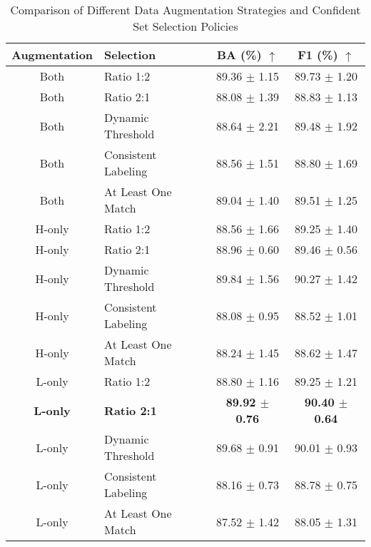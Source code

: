 \documentclass[preprint,12pt,authoryear]{elsarticle}
\begin{document}
\begin{table}[ht]
\centering
\footnotesize
\caption{Comparison of Different Data Augmentation Strategies and Confident Set Selection Policies}
\label{1}
\begin{tabular}{clcc}
\toprule
\textbf{\parbox{2.5cm}{Augmentation}} & \textbf{\parbox{2.5cm}{Selection}} & \textbf{BA (\%)} $\uparrow$ & \textbf{F1 (\%)} $\uparrow$ \\
\midrule
Both & Ratio 1:2 & 89.36 $\pm$ 1.15 & 89.73 $\pm$ 1.20 \\
Both & Ratio 2:1 & 88.08 $\pm$ 1.39 & 88.83 $\pm$ 1.13 \\
Both & Dynamic Threshold & 88.64 $\pm$ 2.21 & 89.48 $\pm$ 1.92 \\
Both & Consistent Labeling & 88.56 $\pm$ 1.51 & 88.80 $\pm$ 1.69 \\
Both & At Least One Match & 89.04 $\pm$ 1.40 & 89.51 $\pm$ 1.25 \\
H-only & Ratio 1:2 & 88.56 $\pm$ 1.66 & 89.25 $\pm$ 1.40 \\
H-only & Ratio 2:1 & 88.96 $\pm$ 0.60 & 89.46 $\pm$ 0.56 \\
H-only & Dynamic Threshold & 89.84 $\pm$ 1.56 & 90.27 $\pm$ 1.42 \\
H-only & Consistent Labeling & 88.08 $\pm$ 0.95 & 88.52 $\pm$ 1.01 \\
H-only & At Least One Match & 88.24 $\pm$ 1.45 & 88.62 $\pm$ 1.47 \\
L-only & Ratio 1:2 & 88.80 $\pm$ 1.16 & 89.25 $\pm$ 1.21 \\
\textbf{L-only} & \textbf{Ratio 2:1} & \textbf{89.92 $\pm$ 0.76} & \textbf{90.40 $\pm$ 0.64} \\
L-only & Dynamic Threshold & 89.68 $\pm$ 0.91 & 90.01 $\pm$ 0.93 \\
L-only & Consistent Labeling & 88.16 $\pm$ 0.73 & 88.78 $\pm$ 0.75 \\
L-only & At Least One Match & 87.52 $\pm$ 1.42 & 88.05 $\pm$ 1.31 \\
\bottomrule
\end{tabular}
\end{table}
\end{document}
